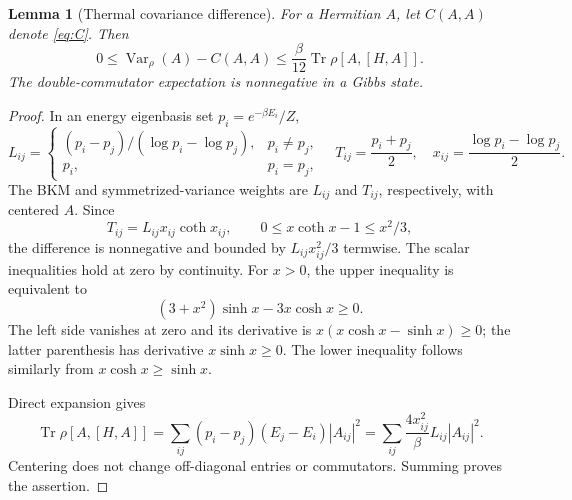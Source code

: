 \documentclass[11pt,a4paper]{article}
\newtheorem{lemma}[theorem]{Lemma}
\theoremstyle{remark}
\newcommand{\Tr}{\operatorname{Tr}}
\newcommand{\Var}{\operatorname{Var}}
\begin{document}
\begin{lemma}[Thermal covariance difference]\label{lem:Harris}
For a Hermitian $A$, let $C(A,A)$ denote \eqref{eq:C}. Then
\begin{equation}
 0\le \Var_\rho(A)-C(A,A)
 \le\frac\beta{12}\Tr\rho[A,[H,A]].
 \label{eq:Harris}
\end{equation}
The double-commutator expectation is nonnegative in a Gibbs state.
\end{lemma}
\begin{proof}
In an energy eigenbasis set $p_i=e^{-\beta E_i}/Z$,
\[
 L_{ij}=\begin{cases}
 (p_i-p_j)/(\log p_i-\log p_j),&p_i\ne p_j,\\
 p_i,&p_i=p_j,
 \end{cases}\quad
 T_{ij}=\frac{p_i+p_j}{2},\quad
 x_{ij}=\frac{\log p_i-\log p_j}{2}.
\]
The BKM and symmetrized-variance weights are $L_{ij}$ and $T_{ij}$, respectively, with centered $A$. Since
\[
 T_{ij}=L_{ij}x_{ij}\coth x_{ij},\qquad
 0\le x\coth x-1\le x^2/3,
\]
the difference is nonnegative and bounded by $L_{ij}x_{ij}^2/3$ termwise. The scalar inequalities hold at zero by continuity. For $x>0$, the upper inequality is equivalent to
\[
 (3+x^2)\sinh x-3x\cosh x\ge0.
\]
The left side vanishes at zero and its derivative is $x(x\cosh x-\sinh x)\ge0$; the latter parenthesis has derivative $x\sinh x\ge0$. The lower inequality follows similarly from $x\cosh x\ge\sinh x$.

Direct expansion gives
\begin{equation}
 \Tr\rho[A,[H,A]]=
 \sum_{ij}(p_i-p_j)(E_j-E_i)|A_{ij}|^2
 =\sum_{ij}\frac{4x_{ij}^2}{\beta}L_{ij}|A_{ij}|^2.
 \label{eq:Wspec}
\end{equation}
Centering does not change off-diagonal entries or commutators. Summing proves the assertion.
\end{proof}
\end{document}
